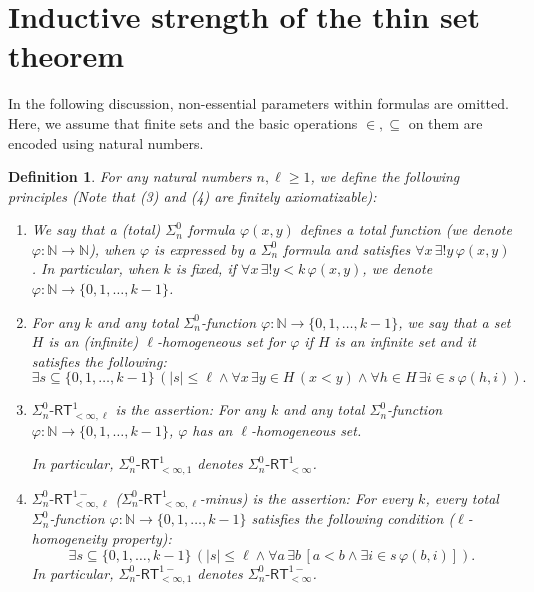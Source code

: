 \documentclass[10pt,reqno]{amsart}
\newtheorem{definition}[theorem]{Definition}
\numberwithin{equation}{section}
\begin{document}
\section{Inductive strength of the thin set theorem}
In the following discussion, non-essential parameters within formulas are omitted. Here, we assume that finite sets and the basic operations $\in,\subseteq$ on them are encoded using natural numbers.
\begin{definition}\label{def:2}
For any natural numbers $n,\ell \ge 1$, we define the following principles (Note that (3) and (4) are finitely axiomatizable):


\begin{enumerate}[topsep=0.5em,itemsep=0.25em]
\item We say that a (total) $\Sigma_{n}^{0}$ formula $\varphi(x,y)$ defines a total function (we denote $\varphi\colon\mathbb{N}\to\mathbb{N}$), when $\varphi$ is expressed by a $\Sigma_{n}^{0}$ formula and satisfies $\forall x \, \exists! y \, \varphi(x,y)$. In particular, when $k$ is fixed, if $\forall x \, \exists! y < k \, \varphi(x,y)$, we denote $\varphi \colon \mathbb{N}\to \{0,1,\dots,k-1\}$.


\item For any $k$ and any total $\Sigma_{n}^{0}$-function $\varphi\colon\mathbb{N}\to \{0,1,\dots,k-1\}$, we say that a set $H$ is an (infinite) $\ell$-homogeneous set for $\varphi$ if $H$ is an infinite set and it satisfies the following:
\[ \exists s\subseteq\{0,1,\dots,k-1\} \, ( |s|\le \ell \land \forall x \, \exists y\in H \, (x<y) \land \forall h\in H \, \exists i\in s \, \varphi(h,i) ). \]


\item $\Sigma_{n}^{0}\text{-}\mathsf{RT}_{<\infty,\ell}^{1}$ is the assertion: For any $k$ and any total $\Sigma_{n}^{0}$-function $\varphi\colon\mathbb{N}\to\{0,1,\dots,k-1\}$, $\varphi$ has an $\ell$-homogeneous set.
  
In particular, $\Sigma_{n}^{0}\text{-}\mathsf{RT}_{<\infty,1}^{1}$ denotes $\Sigma_{n}^{0}\text{-}\mathsf{RT}_{<\infty}^{1}$.
  
\item $\Sigma_{n}^{0}\text{-}\mathsf{RT}_{<\infty,\ell}^{1-}$ ($\Sigma_{n}^{0}\text{-}\mathsf{RT}_{<\infty,\ell}^{1}$-minus) is the assertion:
For every $k$, every total $\Sigma_{n}^{0}$-function $\varphi\colon\mathbb{N}\to\{0,1,\dots,k-1\}$ satisfies the following condition ($\ell$-homogeneity property):
\[ \exists s \subseteq \{0, 1, \dots ,k-1\} \, (|s|\le\ell \land \forall a \, \exists b \, [a < b \land \exists i \in s \, \varphi(b,i)] ). \]
In particular, $\Sigma_{n}^{0}\text{-}\mathsf{RT}_{<\infty,1}^{1-}$ denotes $\Sigma_{n}^{0}\text{-}\mathsf{RT}_{<\infty}^{1-}$.
\end{enumerate}


\end{definition}
\end{document}

